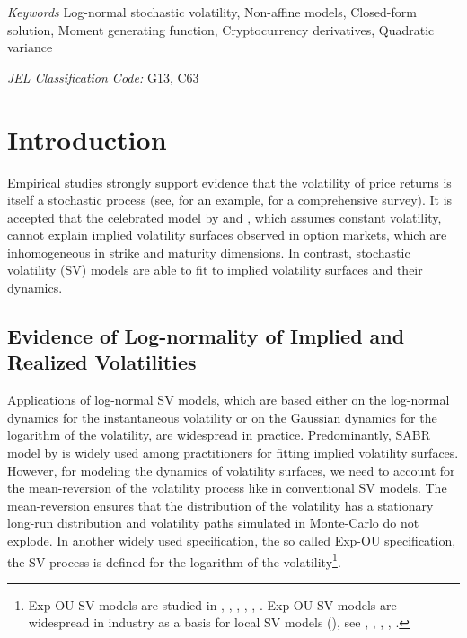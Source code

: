 \documentclass[pdftex,11pt,a4paper] {article}
\begin{document}
\textit{Keywords} Log-normal stochastic volatility, Non-affine models, Closed-form solution, Moment generating function, Cryptocurrency derivatives, Quadratic variance


\textit{JEL Classification Code:} G13, C63



\section{Introduction}


Empirical studies strongly support evidence that the volatility of price returns is itself a stochastic process (see, for an example, \cite{Shephard2005} for a comprehensive survey). It is accepted that the celebrated model by \cite{BS73} and \cite{Merton73}, which assumes constant volatility, cannot explain implied volatility surfaces observed in option markets, which are inhomogeneous in strike and maturity dimensions. In contrast, stochastic volatility (SV) models are able to fit to implied volatility surfaces and their dynamics. 


\subsection{Evidence of Log-normality of Implied and Realized Volatilities}

Applications of log-normal SV models, which are based either on the log-normal dynamics for the instantaneous volatility or on the Gaussian dynamics for the logarithm of the volatility, are widespread in practice. Predominantly, SABR model by \cite{Hagan2002} is widely used among practitioners for fitting implied volatility surfaces. However, for modeling the dynamics of volatility surfaces, we need to account for the mean-reversion of the volatility process like in conventional SV models. The mean-reversion ensures that the distribution of the volatility has a stationary long-run distribution and volatility paths simulated in Monte-Carlo do not explode. In another widely used specification, the so called Exp-OU specification, the SV process is defined for the logarithm of the volatility\footnote{Exp-OU SV models are studied in \cite{Fouque2000}, \cite{Detemple2000},  \cite{Masoliver2006}, \cite{perello2008}, \cite{MuhleKarbe2012}, \cite{drimus2012a}. Exp-OU SV models are widespread in industry as a basis for local SV models (\cite{Lipton2002}), see \cite{bergomi2005}, \cite{buhler2006}, \cite{RenMadan2007}, \cite{labord2009}, \cite{bergomi2012}.}. 
\end{document}
